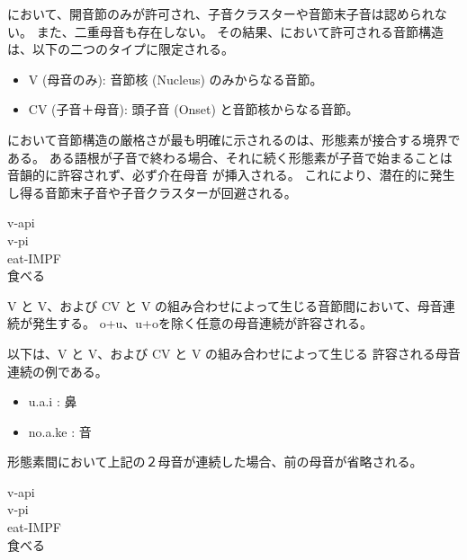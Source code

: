 \langname において、開音節のみが許可され、子音クラスターや音節末子音は認められない。
また、二重母音も存在しない。
その結果、\langname において許可される音節構造は、以下の二つのタイプに限定される。

\begin{itemize}
    \item {V (母音のみ)}: 音節核 (Nucleus) のみからなる音節。
    \item {CV (子音＋母音)}: 頭子音 (Onset) と音節核からなる音節。
\end{itemize}


\langname において音節構造の厳格さが最も明確に示されるのは、形態素が接合する境界である。
ある語根が子音で終わる場合、それに続く形態素が子音で始まることは音韻的に許容されず、必ず介在母音
が挿入される。
これにより、潜在的に発生し得る音節末子音や子音クラスターが回避される。

\begin{exe}
    \ex \glll v-api \\
    v-pi \\
    eat-IMPF \\
        \glt 食べる
\end{exe}


{V} と {V}、および {CV} と {V} の組み合わせによって生じる音節間において、母音連続が発生する。
o+u、u+oを除く任意の母音連続が許容される。

以下は、{V} と {V}、および {CV} と {V} の組み合わせによって生じる
許容される母音連続の例である。

\begin{itemize}
    \item u.a.i : 鼻
    \item no.a.ke : 音
\end{itemize}


形態素間において上記の２母音が連続した場合、前の母音が省略される。
\begin{exe}
    \ex \glll v-api \\
    v-pi \\
    eat-IMPF \\
        \glt 食べる
\end{exe}
